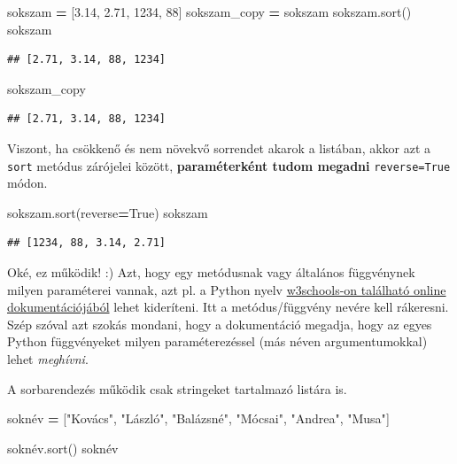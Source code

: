 \documentclass[
]{book}
\newenvironment{Shaded}{\begin{snugshade}}{\end{snugshade}}
\newcommand{\DecValTok}[1]{\textcolor[rgb]{0.00,0.00,0.81}{#1}}
\newcommand{\FloatTok}[1]{\textcolor[rgb]{0.00,0.00,0.81}{#1}}
\newcommand{\NormalTok}[1]{#1}
\newcommand{\OperatorTok}[1]{\textcolor[rgb]{0.81,0.36,0.00}{\textbf{#1}}}
\newcommand{\StringTok}[1]{\textcolor[rgb]{0.31,0.60,0.02}{#1}}
\newcommand{\VariableTok}[1]{\textcolor[rgb]{0.00,0.00,0.00}{#1}}
\begin{document}
\begin{Shaded}
\begin{Highlighting}[]
\NormalTok{sokszam }\OperatorTok{=}\NormalTok{ [}\FloatTok{3.14}\NormalTok{, }\FloatTok{2.71}\NormalTok{, }\DecValTok{1234}\NormalTok{, }\DecValTok{88}\NormalTok{]}
\NormalTok{sokszam\_copy }\OperatorTok{=}\NormalTok{ sokszam}
\NormalTok{sokszam.sort()}
\NormalTok{sokszam}
\end{Highlighting}
\end{Shaded}

\begin{verbatim}
## [2.71, 3.14, 88, 1234]
\end{verbatim}

\begin{Shaded}
\begin{Highlighting}[]
\NormalTok{sokszam\_copy}
\end{Highlighting}
\end{Shaded}

\begin{verbatim}
## [2.71, 3.14, 88, 1234]
\end{verbatim}

Viszont, ha csökkenő és nem növekvő sorrendet akarok a listában, akkor azt a \texttt{sort} metódus zárójelei között, \textbf{paraméterként tudom megadni} \texttt{reverse=True} módon.

\begin{Shaded}
\begin{Highlighting}[]
\NormalTok{sokszam.sort(reverse}\OperatorTok{=}\VariableTok{True}\NormalTok{)}
\NormalTok{sokszam}
\end{Highlighting}
\end{Shaded}

\begin{verbatim}
## [1234, 88, 3.14, 2.71]
\end{verbatim}

Oké, ez működik! :) Azt, hogy egy metódusnak vagy általános függvénynek milyen paraméterei vannak, azt pl. a Python nyelv \href{https://www.w3schools.com/python/ref_list_sort.asp}{w3schools-on található online dokumentációjából} lehet kideríteni. Itt a metódus/függvény nevére kell rákeresni.
Szép szóval azt szokás mondani, hogy a dokumentáció megadja, hogy az egyes Python függvényeket milyen paraméterezéssel (más néven argumentumokkal) lehet \emph{meghívni}.

A sorbarendezés működik csak stringeket tartalmazó listára is.

\begin{Shaded}
\begin{Highlighting}[]
\NormalTok{soknév }\OperatorTok{=}\NormalTok{ [}\StringTok{"Kovács"}\NormalTok{, }\StringTok{"László"}\NormalTok{, }\StringTok{"Balázsné"}\NormalTok{, }\StringTok{"Mócsai"}\NormalTok{, }\StringTok{"Andrea"}\NormalTok{, }\StringTok{"Musa"}\NormalTok{]}

\NormalTok{soknév.sort()}
\NormalTok{soknév}
\end{Highlighting}
\end{Shaded}
\end{document}
